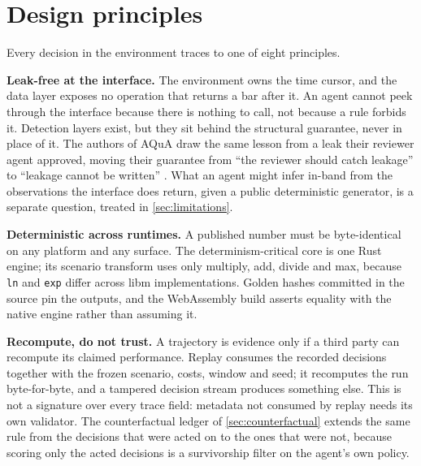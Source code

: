 \section{Design principles}\label{sec:principles}

Every decision in the environment traces to one of eight principles.

\textbf{Leak-free at the interface.} The environment owns the time cursor, and the data layer exposes no operation that returns a bar after it. An agent cannot peek through the interface because there is nothing to call, not because a rule forbids it. Detection layers exist, but they sit behind the structural guarantee, never in place of it. The authors of AQuA draw the same lesson from a leak their reviewer agent approved, moving their guarantee from ``the reviewer should catch leakage'' to ``leakage cannot be written'' \citep[p.~22]{guo2026aqua}. What an agent might infer in-band from the observations the interface does return, given a public deterministic generator, is a separate question, treated in \cref{sec:limitations}.

\textbf{Deterministic across runtimes.} A published number must be byte-identical on any platform and any surface. The determinism-critical core is one Rust engine; its scenario transform uses only multiply, add, divide and max, because \texttt{ln} and \texttt{exp} differ across libm implementations. Golden hashes committed in the source pin the outputs, and the WebAssembly build asserts equality with the native engine rather than assuming it.

\textbf{Recompute, do not trust.} A trajectory is evidence only if a third party can recompute its claimed performance. Replay consumes the recorded decisions together with the frozen scenario, costs, window and seed; it recomputes the run byte-for-byte, and a tampered decision stream produces something else. This is not a signature over every trace field: metadata not consumed by replay needs its own validator. The counterfactual ledger of \cref{sec:counterfactual} extends the same rule from the decisions that were acted on to the ones that were not, because scoring only the acted decisions is a survivorship filter on the agent's own policy.

